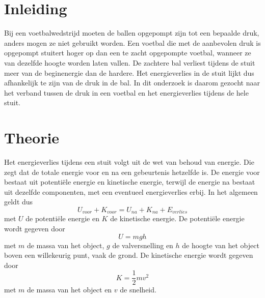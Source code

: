 \documentclass[11pt,a4paper]{article}
\begin{document}
\setcounter{page}{2}    %

\suppressfloats[t]      %


\section{Inleiding}
Bij een voetbalwedstrijd moeten de ballen opgepompt zijn tot een bepaalde druk, anders mogen ze niet gebruikt worden. Een voetbal die met de aanbevolen druk is opgepompt stuitert hoger op dan een te zacht opgepompte voetbal, wanneer ze van dezelfde hoogte worden laten vallen. De zachtere bal verliest tijdens de stuit meer van de beginenergie dan de hardere. Het energieverlies in de stuit lijkt dus afhankelijk te zijn van de druk in de bal. In dit onderzoek is daarom gezocht naar het verband tussen de druk in een voetbal en het energieverlies tijdens de hele stuit.

\section{Theorie}
Het energieverlies tijdens een stuit volgt uit de wet van behoud van energie. Die zegt dat de totale energie voor en na een gebeurtenis hetzelfde is. De energie voor bestaat uit potentiële energie en kinetische energie, terwijl de energie na bestaat uit dezelfde componenten, met een eventueel energieverlies erbij. In het algemeen geldt dus
\begin{equation}
U_{voor} + K_{voor} = U_{na} + K_{na} + E_{verlies}
\label{eq:behoud-van-energie}
\end{equation}
met $U$ de potentiële energie en $K$ de kinetische energie. De potentiële energie wordt gegeven door
\begin{equation}
U = mgh
\label{eq:potentiele-energie}
\end{equation}
met $m$ de massa van het object, $g$ de valversnelling en $h$ de hoogte van het object boven een willekeurig punt, vaak de grond. De kinetische energie wordt gegeven door
\begin{equation}
K = \frac{1}{2}mv^2
\label{eq:kinetische-energie}
\end{equation}
met $m$ de massa van het object en $v$ de snelheid.
\end{document}
